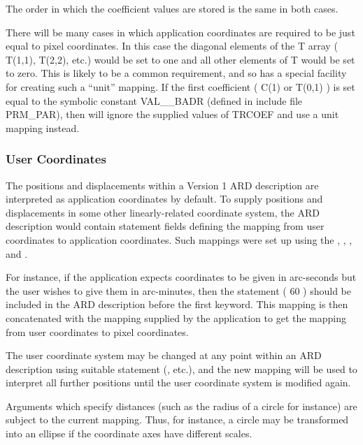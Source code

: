 \documentclass[11pt,nolof]{starlink}
\begin{document}
The order in which the coefficient values are stored is the same in both
cases.

There will be many cases in which application coordinates are required to be
just equal to pixel coordinates. In this case the diagonal elements of the T
array ( T(1,1), T(2,2), etc.) would be set to one and all other elements of T
would be set to zero. This is likely to be a common requirement, and so
 has a special facility for creating such a ``unit'' mapping. If the
first coefficient ( C(1) or T(0,1) ) is set equal to the symbolic constant
VAL\_\_BADR (defined in include file PRM\_PAR), then  will ignore the
supplied values of TRCOEF and use a unit mapping instead.

\subsubsection{User Coordinates}
The positions and displacements within a Version 1 ARD description are
interpreted as
application coordinates by default. To supply positions
and displacements in some other linearly-related coordinate system, the ARD
description would contain statement fields defining the mapping from user
coordinates to application coordinates. Such mappings were set up using the
,
,
,
 and
.

For instance, if the application expects coordinates to be given in
arc-seconds but the user wishes to give them in arc-minutes, then the
statement ( 60 ) should be included in the ARD
description before the first keyword. This mapping is then concatenated
with the mapping supplied by the application to get the mapping from user
coordinates to pixel coordinates.

The user coordinate system may be changed at any point within an ARD
description using suitable statement (, etc.),
and the new mapping will be used to interpret all further positions until
the user coordinate system is modified again.

Arguments which specify distances (such as the radius of a circle for instance)
are subject to the current mapping. Thus, for instance, a circle may be
transformed into an ellipse if the coordinate axes have different scales.
\end{document}
